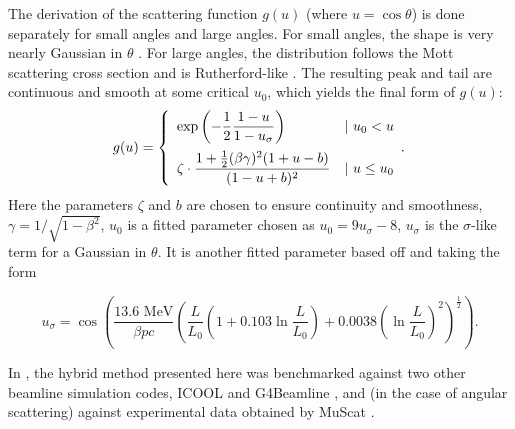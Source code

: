 \documentclass{jacow}
\begin{document}
The derivation of the scattering function $g(u)$ (where  $u = \cos\theta$) is done separately for small angles and large angles. For small angles, the shape is very nearly Gaussian in $\theta$ \cite{GS}. For large angles, the distribution follows the Mott scattering cross section and is Rutherford-like \cite{Mott}. The resulting peak and tail are continuous and smooth at some critical $u_0$, which yields the final form of $g(u)$:
\begin{equation}
  g(u) = \left\{
  \begin{array}{lr}
    \displaystyle{\exp\left(-\frac{1}{2}\frac{1-u}{1-u_\sigma}\right)} & |\text{ } u_0 < u\vspace*{5pt}\\
    \displaystyle{\zeta\cdot\frac{1+\frac{1}{2}(\beta\gamma)^2(1+u-b)}{(1-u+b)^2}} & | \text{ } u \le u_0
  \end{array}.
\right.
\label{eq:scattering}
\end{equation}
Here the parameters $\zeta$ and $b$ are chosen to ensure continuity and smoothness, $\gamma=1/\sqrt{1-\beta^2}$, $u_0$ is a fitted parameter chosen as $u_0=9u_\sigma-8$, $u_\sigma$ is the $\sigma$-like term for a Gaussian in $\theta$. It is another fitted parameter based off \cite{highland} and taking the form
\begin{footnotesize}
\[
u_\sigma=\cos\left(\frac{13.6 \text{ MeV}}{\beta pc}\left(\frac{L}{L_0}\left(1+0.103\ln\frac{L}{L_0}\right)+0.0038\left(\ln\frac{L}{L_0}\right)^2\right)^\frac{1}{2}\right).
\]
\end{footnotesize}


In \cite{icap15}, the hybrid method presented here was benchmarked against two other beamline simulation codes, ICOOL \cite{ICOOL} and G4Beamline \cite{G4BL}, and (in the case of angular scattering) against experimental data obtained by MuScat \cite{Muscat}.

\end{document}
